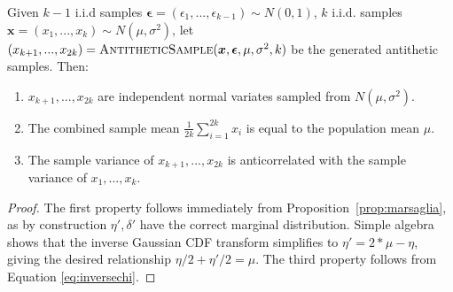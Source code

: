 
\begin{prop}
Given $k - 1$ i.i.d samples $\boldsymbol{\epsilon} = (\epsilon_1, ..., \epsilon_{k-1}) \sim N(0, 1)$, $k$ i.i.d. samples $\boldsymbol{x} = (x_1, ..., x_k) \sim N(\mu, \sigma^2)$, let $(x_{k+1}, ..., x_{2k}) = \textsc{AntitheticSample}(\boldsymbol{x}, \boldsymbol{\epsilon}, \mu, \sigma^2, k)$ be the generated antithetic samples. Then:
\begin{enumerate}
\item $x_{k+1}, ..., x_{2k}$ are independent normal variates sampled from $N(\mu, \sigma^2)$.
\item The combined sample mean $\frac{1}{2k}\sum_{i=1}^{2k}x_i$ is equal to the population mean $\mu$.
\item The sample variance of $x_{k+1}, ..., x_{2k}$ is anticorrelated with the sample variance of $x_1, ..., x_k$.
\end{enumerate}
\label{prop:antithetic}
\end{prop}
\begin{proof}
The first property follows immediately from Proposition~\ref{prop:marsaglia}, as by construction $\eta', \delta'$ have the correct marginal distribution. Simple algebra shows that the inverse Gaussian CDF transform simplifies to $\eta' = 2 * \mu - \eta$, giving the desired relationship $\eta/2 + \eta'/2 = \mu $. The third property follows from Equation \ref{eq:inversechi}.
\end{proof}

